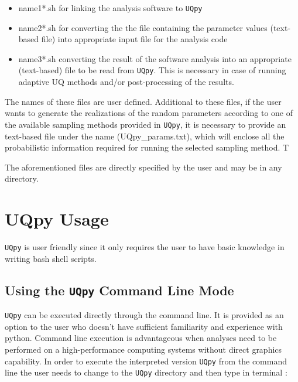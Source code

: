 \documentclass[preprint,12pt]{elsarticle}
\begin{document}
\begin{itemize}
\item {\color{red}name1*.sh} for linking the analysis software to \texttt{UQpy} 

\item {\color{red}name2*.sh} for converting the the file containing the parameter values (text-based file) into appropriate input file for the analysis code  

\item {\color{red}name3*.sh} converting the result of the software analysis into an appropriate  (text-based) file to be read from \texttt{UQpy}. This is necessary  in case of running adaptive UQ methods and/or post-processing of the results. 
\end{itemize}

\noindent
The names of these files are user defined. Additional to these files, if the user wants to  generate the realizations of the random parameters according to one of the  available sampling methods  provided in \texttt{UQpy}, it is necessary to provide an text-based file under the name  ({\color{magenta}UQpy\_params.txt}), which will enclose all the probabilistic information required for running the selected sampling method. T

The aforementioned files are directly specified by the user and may be in any directory.


\section{UQpy Usage}

\noindent
\texttt{UQpy} is user friendly since it only requires the user to have basic knowledge in writing bash shell scripts.

\subsection{Using the \texttt{UQpy}  Command Line Mode}

\noindent
\texttt{UQpy} can be executed directly through the command line. It is provided as an option to the user who doesn't have sufficient familiarity and experience with python. Command line execution is advantageous when analyses need to be performed on a high-performance computing systems without direct graphics capability. In order to  execute the interpreted version \texttt{UQpy} from the command line the user needs to  change to the \texttt{UQpy} directory and then type in terminal :
\end{document}
